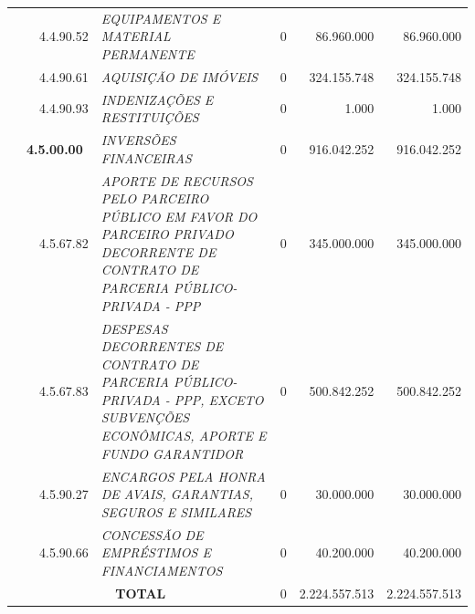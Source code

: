 \documentclass{article}
\begin{document}
\begin{longtable}[c]{m{0.1cm}m{0.1cm}m{0.8cm}|m{8cm}|m{2cm}|m{2cm}|m{2cm}}
\multicolumn{1}{l}{} & \multicolumn{1}{l}{} & \multicolumn{1}{l|}{4.4.90.52} & \multicolumn{1}{L{8cm}|}{\textit{EQUIPAMENTOS E MATERIAL PERMANENTE}} & \multicolumn{1}{r|}{0} & \multicolumn{1}{r|}{86.960.000} &  \multicolumn{1}{r}{86.960.000}\\
\multicolumn{1}{l}{} & \multicolumn{1}{l}{} & \multicolumn{1}{l|}{4.4.90.61} & \multicolumn{1}{L{8cm}|}{\textit{AQUISIÇÃO DE IMÓVEIS}} & \multicolumn{1}{r|}{0} & \multicolumn{1}{r|}{324.155.748} &  \multicolumn{1}{r}{324.155.748}\\
\multicolumn{1}{l}{} & \multicolumn{1}{l}{} & \multicolumn{1}{l|}{4.4.90.93} & \multicolumn{1}{L{8cm}|}{\textit{INDENIZAÇÕES E RESTITUIÇÕES}} & \multicolumn{1}{r|}{0} & \multicolumn{1}{r|}{1.000} &  \multicolumn{1}{r}{1.000}\\
\multicolumn{1}{l}{} & \multicolumn{2}{l|}{\textbf{4.5.00.00}} & \multicolumn{1}{L{8cm}|}{\textit{INVERSÕES FINANCEIRAS}} & \multicolumn{1}{r|}{0} & \multicolumn{1}{r|}{916.042.252} &  \multicolumn{1}{r}{916.042.252}\\
\multicolumn{1}{l}{} & \multicolumn{1}{l}{} & \multicolumn{1}{l|}{4.5.67.82} & \multicolumn{1}{L{8cm}|}{\textit{APORTE DE RECURSOS PELO PARCEIRO PÚBLICO EM FAVOR DO PARCEIRO PRIVADO DECORRENTE DE CONTRATO DE PARCERIA PÚBLICO-PRIVADA - PPP}} & \multicolumn{1}{r|}{0} & \multicolumn{1}{r|}{345.000.000} &  \multicolumn{1}{r}{345.000.000}\\
\multicolumn{1}{l}{} & \multicolumn{1}{l}{} & \multicolumn{1}{l|}{4.5.67.83} & \multicolumn{1}{L{8cm}|}{\textit{DESPESAS DECORRENTES DE CONTRATO DE PARCERIA PÚBLICO-PRIVADA - PPP, EXCETO SUBVENÇÕES ECONÔMICAS, APORTE E FUNDO GARANTIDOR}} & \multicolumn{1}{r|}{0} & \multicolumn{1}{r|}{500.842.252} &  \multicolumn{1}{r}{500.842.252}\\
\multicolumn{1}{l}{} & \multicolumn{1}{l}{} & \multicolumn{1}{l|}{4.5.90.27} & \multicolumn{1}{L{8cm}|}{\textit{ENCARGOS PELA HONRA DE AVAIS, GARANTIAS, SEGUROS E SIMILARES}} & \multicolumn{1}{r|}{0} & \multicolumn{1}{r|}{30.000.000} &  \multicolumn{1}{r}{30.000.000}\\
\multicolumn{1}{l}{} & \multicolumn{1}{l}{} & \multicolumn{1}{l|}{4.5.90.66} & \multicolumn{1}{L{8cm}|}{\textit{CONCESSÃO DE EMPRÉSTIMOS E FINANCIAMENTOS}} & \multicolumn{1}{r|}{0} & \multicolumn{1}{r|}{40.200.000} &  \multicolumn{1}{r}{40.200.000}\\
\hline
\multicolumn{4}{c|}{\textbf{TOTAL}} & \multicolumn{1}{r|}{0} & \multicolumn{1}{r|}{2.224.557.513} &  \multicolumn{1}{r}{2.224.557.513}
\end{longtable}
\newpage
\ifthispageodd{ }{\afterpage{\null\thispagestyle{empty}\newpage}}
\end{document}
